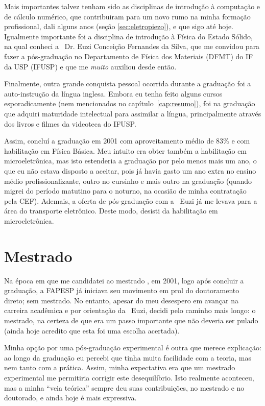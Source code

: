Mais importantes talvez tenham sido as disciplinas de introdução à computação e de cálculo numérico, que contribuiram para um novo rumo na minha formação profissional, dali alguns anos (seção \ref{sec:eletropiezo}), e que sigo até hoje. Igualmente importante foi a disciplina de introdução à Física do Estado Sólido, na qual conheci a \profa\ Dr\rlap{\textordfeminine}. Euzi Conceição Fernandes da Silva, que me convidou para fazer a pós-graduação no Departamento de Física dos Materiais (DFMT) do IF da USP (IFUSP) e que me \emph{muito} auxiliou desde então.

Finalmente, outra grande conquista pessoal ocorrida durante a graduação foi a auto-instrução da língua inglesa. Embora eu tenha feito alguns cursos esporadicamente (nem mencionados no capítulo~\ref{cap:resumo}), foi na graduação que adquiri maturidade intelectual para assimilar a língua, principalmente através dos livros e filmes da videoteca do IFUSP.

Assim, concluí a graduação em 2001 com aproveitamento médio de 83\% e com habilitação em Física Básica. Meu intuito era obter também a habilitação em microeletrônica, mas isto estenderia a graduação por pelo menos mais um ano, o que eu não estava disposto a aceitar, pois já havia gasto um ano extra no ensino médio profissionalizante, outro no cursinho e mais outro na graduação (quando migrei do período matutino para o noturno, na ocasião de minha contratação pela CEF). Ademais, a oferta de pós-graduação com a \profa\ Euzi já me levava para a área do transporte eletrônico. Deste modo, desisti da habilitação em microeletrônica.
 
\section{Mestrado}

Na época em que me candidatei ao mestrado , em 2001, logo após concluir a graduação, a FAPESP já iniciava seu movimento em prol do doutoramento direto; sem mestrado. No entanto, apesar do meu desespero em avançar na carreira acadêmica e por orientação da \profa\ Euzi, decidi pelo caminho mais longo: o mestrado, na certeza de que era um passo importante que não deveria ser pulado (ainda hoje acredito que esta foi uma escolha acertada).

Minha opção por uma pós-graduação experimental é outra que merece explicação: ao longo da graduação eu percebi que tinha muita facilidade com a teoria, mas nem tanto com a prática. Assim, minha expectativa era que um mestrado experimental me permitiria corrigir este desequilíbrio. Isto realmente aconteceu, mas a minha ``veia teórica'' sempre deu suas contribuições, no mestrado e no doutorado, e ainda hoje é mais expressiva.

